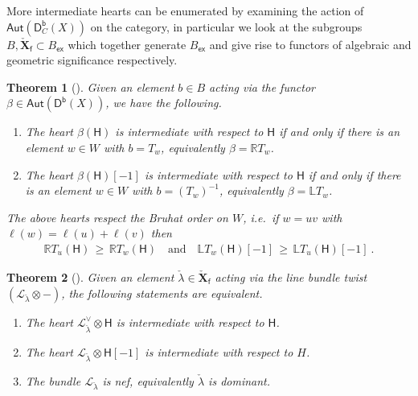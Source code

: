 \documentclass[reqno,a4paper]{amsart}
\newcommand{\calL}{\mathcal{L}}
\newcommand{\LL}{\mathbb{L}}
\newcommand{\R}{\mathbb{R}}
\newcommand{\sfH}{\mathsf{H}}
\newcommand{\sff}{\mathsf{f}}
\newcommand{\bfX}{\mathbf{X}}
\newcommand{\catDb}{\mathsf{D}^\mathsf{b}}
\newcommand{\catDbC}{\mathsf{D}^\mathsf{b}_C}
\newcommand{\Llambda}{{\check{\lambda}}}
\newcommand{\weightlattice}{\bfX}
\newcommand{\coweightlattice}{\check{\weightlattice}}
\newcommand{\coweightlatticefin}{\coweightlattice_\sff}
\newcommand{\sfex}{\mathsf{ex}}
\newcommand{\rsv}{X}
\newcommand{\Aut}{\mathsf{Aut}}
\theoremstyle{basic-theorem}
\newtheorem{theorem}{Theorem}[section]
\numberwithin{equation}{section}
\begin{document}
More intermediate hearts can be enumerated by examining the action of $\Aut(\catDbC(\rsv))$ on the category, in particular we look at the subgroups $B,\coweightlatticefin\subset B_\sfex$ which together generate $B_\sfex$ and give rise to functors of algebraic and geometric significance respectively.
\begin{theorem}[{\cite[Theorem 6.5]{IR08}}]
    Given an element $b\in B$  acting via the functor $\beta\in \Aut(\catDb(\rsv))$, we have the following.
    \begin{enumerate}\itemsep0.2cm
        \item The heart $\beta(\sfH)$ is intermediate with respect to $\sfH$ if and only if there is an element $w\in W$ with $b=T_w$, equivalently $\beta=\R T_w$.
        \item The heart $\beta(\sfH)[-1]$ is intermediate with respect to $\sfH$ if and only if there is an element $w\in W$ with $b=(T_w)^{-1}$, equivalently $\beta=\LL T_w $.
    \end{enumerate}
    The above hearts respect the Bruhat order on $W$, i.e.\ if $w=uv$ with $\ell(w)=\ell(u)+\ell(v)$ then
	\begin{align}
	   \R T_u (\sfH) \,\geq\, \R T_w (\sfH) \quad \text{and} \quad \LL  T_w (\sfH)[-1] \,\geq\, \LL  T_u (\sfH)[-1]\ .
\end{align}
\end{theorem}

\begin{theorem}[{\cite[Theorem~6.3--1]{Shimpi_Torsion_pairs}}]\label{thm:linebundle-tstructure}
    Given an element $\Llambda\in \coweightlatticefin$ acting via the line bundle twist $(\calL_{\Llambda}\otimes -)$, the following statements are equivalent.
    \begin{enumerate}\itemsep0.2cm
        \item The heart $\calL_{\Llambda}^\vee\otimes \sfH$ is intermediate with respect to $\sfH$.
        \item The heart $\calL_{\Llambda}\otimes \sfH[-1]$ is intermediate with respect to $H$.
        \item The bundle $\calL_{\Llambda}$ is nef, equivalently $\Llambda$ is dominant.
    \end{enumerate}
\end{theorem}
\end{document}

